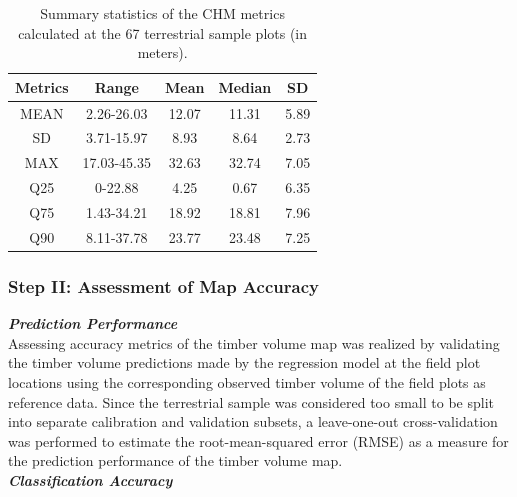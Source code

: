 
\begin{table}[H]
	\begin{center}
		\caption{Summary  statistics  of  the  CHM  metrics  calculated  at  the  67  terrestrial sample plots (in meters).}
		\vspace{0.2cm}
		\label{tab:sumCHMmetr}
		{\small %
			\begin{tabular}{|c|c|c|c|c|} %
				\hlineB{1}
				Metrics & Range & Mean & Median & SD \\
				\hline \hline
				MEAN & 2.26-26.03 & 12.07 & 11.31 & 5.89 \\
				SD & 3.71-15.97 & 8.93 & 8.64 & 2.73 \\
				MAX & 17.03-45.35 & 32.63 &	32.74 &	7.05 \\
				Q25	& 0-22.88 &	4.25 & 0.67 & 6.35 \\
				Q75	& 1.43-34.21 & 18.92 & 18.81 & 7.96 \\
				Q90	& 8.11-37.78 & 23.77 & 23.48 & 7.25 \\
				\hline \hline
			\end{tabular}
		}%
	\end{center}
\end{table}





\subsubsection{Step II: Assessment of Map Accuracy}
\label{sec:step2}

\textit{\textbf{Prediction Performance}}\\

Assessing accuracy metrics of the timber volume map was realized by validating the timber volume predictions made by the regression model at the field plot locations using the corresponding observed timber volume of the field plots as reference data. Since the terrestrial sample was considered too small to be split into separate calibration and validation subsets, a leave-one-out cross-validation was performed to estimate the root-mean-squared error (RMSE) as a measure for the prediction performance of the timber volume map.\\

\textit{\textbf{Classification Accuracy}}\\

